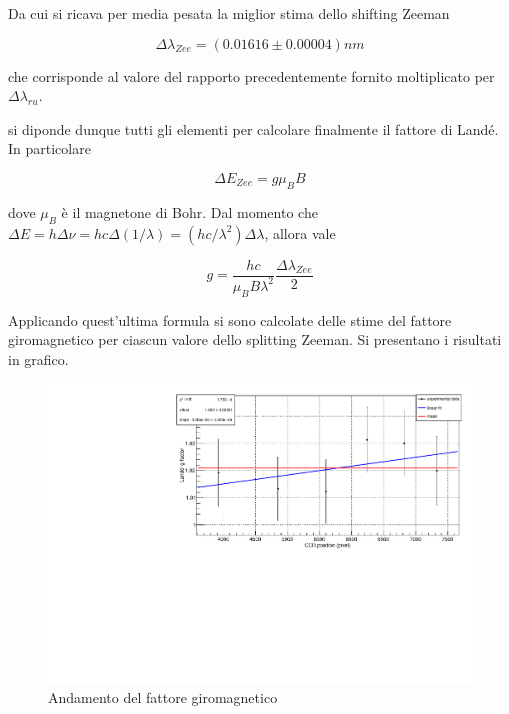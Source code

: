 \documentclass{article}
\begin{document}
	Da cui si ricava per media pesata la miglior stima dello shifting Zeeman

	\[
		\Delta\lambda_{Zee} = (0.01616 \pm 0.00004) nm	
	\]

	che corrisponde al valore del rapporto precedentemente fornito moltiplicato per $\Delta\lambda_{ru}$.

	si diponde dunque tutti gli elementi per calcolare finalmente il fattore di Landé. In particolare

	\begin{equation}
		\Delta E_{Zee} = g \mu_B B
	\end{equation}

	dove $\mu_B$ è il magnetone di Bohr.
	Dal momento che $\Delta E = h\Delta\nu = hc\Delta(1/\lambda) = (hc / \lambda^2) \Delta\lambda$, 
	allora vale 

	\begin{equation}
		g = \frac{hc}{\mu_B B \lambda^2} \frac{\Delta\lambda_{Zee}}{2}
	\end{equation}

	Applicando quest'ultima formula si sono calcolate delle stime del fattore giromagnetico per ciascun
	valore dello splitting Zeeman. Si presentano i risultati in grafico.

	\begin{center}
		\begin{figure}[H]
			\centering
			\includegraphics[scale=0.38, angle=0]{campomax/g.pdf}
			\caption{Andamento del fattore giromagnetico}
			\label{fig:g}
		\end{figure}
	\end{center}
\end{document}
